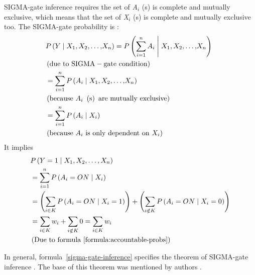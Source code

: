 \documentclass{article}
\numberwithin{equation}{section}
\numberwithin{figure}{section}
\numberwithin{table}{section}
\begin{document}
SIGMA-gate inference requires the set of \textit{A${}_{i}$} (s) is complete and mutually exclusive, which means that the set of \textit{X${}_{i}$} (s) is complete and mutually exclusive too. The SIGMA-gate probability is \cite{nguyen:sigma}:
\begin{align*}
&P\left(Y\mathrel{\left|\vphantom{Y X_{\mathrm{1}},X_{\mathrm{2}}\mathrm{,\dots ,}X_n}\right.\kern-\nulldelimiterspace}X_{\mathrm{1}},X_{\mathrm{2}}\mathrm{,\dots ,}X_n\right)=P\left(\sum^n_{i\mathrm{=1}}{A_i}\mathrel{\left|\vphantom{\sum^n_{i\mathrm{=1}}{A_i} X_{\mathrm{1}},X_{\mathrm{2}}\mathrm{,\dots ,}X_n}\right.\kern-\nulldelimiterspace}X_{\mathrm{1}},X_{\mathrm{2}}\mathrm{,\dots ,}X_n\right)\mathrm{\ }\\
&\left(\mathrm{due\ to\ SIGMA-gate\ condition}\right)\\
&=\sum^n_{i\mathrm{=1}}{P\left(A_i\mathrel{\left|\vphantom{A_i X_{\mathrm{1}},X_{\mathrm{2}}\mathrm{,\dots ,}X_n}\right.\kern-\nulldelimiterspace}X_{\mathrm{1}},X_{\mathrm{2}}\mathrm{,\dots ,}X_n\right)}\mathrm{\ }\\
&\left(\mathrm{because\ }A_i\mathrm{\ }\left(\mathrm{s}\right)\mathrm{\ are\ mutually\ exclusive}\right)\\
&=\sum^n_{i\mathrm{=1}}{P\left(A_i\mathrel{\left|\vphantom{A_i X_i}\right.\kern-\nulldelimiterspace}X_i\right)}\\
&\left(\mathrm{because\ }A_i\mathrm{\ is\ only\ dependent\ on\ }X_i\right)
\end{align*}
It implies
\begin{align*}
&P\left(Y=1\mathrel{\left|\vphantom{Y=1 X_1,X_2,\dots ,X_n}\right.\kern-\nulldelimiterspace}X_1,X_2,\dots ,X_n\right)\\
&=\sum^n_{i=1}{P\left(A_i=ON\mathrel{\left|\vphantom{A_i=ON X_i}\right.\kern-\nulldelimiterspace}X_i\right)}\\
&=\left(\sum_{i\in K}{P\left(A_i=ON\mathrel{\left|\vphantom{A_i=ON X_i=1}\right.\kern-\nulldelimiterspace}X_i=1\right)}\right)+\left(\sum_{i\notin K}{P\left(A_i=ON\mathrel{\left|\vphantom{A_i=ON X_i=0}\right.\kern-\nulldelimiterspace}X_i=0\right)}\right)\\
&=\sum_{i\in K}{w_i}+\sum_{i\notin K}{0}=\sum_{i\in K}{w_i}\\
&\left(\mathrm{Due}\ \mathrm{to}\ \mathrm{formula}\ \mathrm{\ref{formula:accountable-probs}}\right)
\end{align*}

In general, formula~\ref{sigma-gate-inference} specifies the theorem of SIGMA-gate inference \cite{nguyen:sigma}. The base of this theorem was mentioned by authors \cite[pp.~292-295]{millan:bayesiandiagnostic}.
\end{document}
